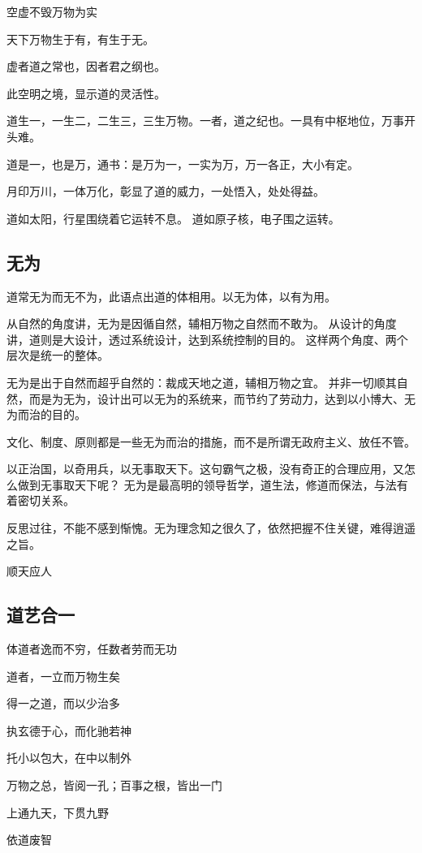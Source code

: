 \begin{enumbox}
\item 空虚不毁万物为实
\item 天下万物生于有，有生于无。
\item 虚者道之常也，因者君之纲也。
\end{enumbox}

此空明之境，显示道的灵活性。

道生一，一生二，二生三，三生万物。一者，道之纪也。一具有中枢地位，万事开头难。

道是一，也是万，通书：是万为一，一实为万，万一各正，大小有定。

月印万川，一体万化，彰显了道的威力，一处悟入，处处得益。

道如太阳，行星围绕着它运转不息。
道如原子核，电子围之运转。

\subsection{无为}

道常无为而无不为，此语点出道的体相用。以无为体，以有为用。

从自然的角度讲，无为是因循自然，辅相万物之自然而不敢为。
从设计的角度讲，道则是大设计，透过系统设计，达到系统控制的目的。
这样两个角度、两个层次是统一的整体。

无为是出于自然而超乎自然的：裁成天地之道，辅相万物之宜。
并非一切顺其自然，而是为无为，设计出可以无为的系统来，而节约了劳动力，达到以小博大、无为而治的目的。

文化、制度、原则都是一些无为而治的措施，而不是所谓无政府主义、放任不管。

以正治国，以奇用兵，以无事取天下。这句霸气之极，没有奇正的合理应用，又怎么做到无事取天下呢？
无为是最高明的领导哲学，道生法，修道而保法，与法有着密切关系。

反思过往，不能不感到惭愧。无为理念知之很久了，依然把握不住关键，难得逍遥之旨。

顺天应人

\subsection{道艺合一}

\begin{enumbox}
\item 体道者逸而不穷，任数者劳而无功
\item 道者，一立而万物生矣
\item 得一之道，而以少治多
\item 执玄德于心，而化驰若神
\item 托小以包大，在中以制外
\item 万物之总，皆阅一孔；百事之根，皆出一门
\item 上通九天，下贯九野
\item 依道废智
\end{enumbox}

